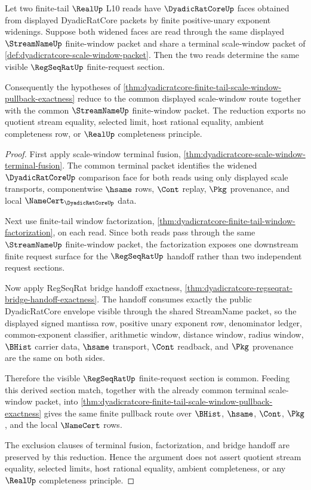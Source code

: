 \begin{theorem}
\label{thm:dyadicratcore-finite-tail-common-scale-window-reduction}
Let two finite-tail $\RealUp$ L10 reads have $\DyadicRatCoreUp$ faces obtained from displayed DyadicRatCore packets by finite positive-unary exponent widenings. Suppose both widened faces are read through the same displayed $\StreamNameUp$ finite-window packet and share a terminal scale-window packet of \autoref{def:dyadicratcore-scale-window-packet}. Then the two reads determine the same visible $\RegSeqRatUp$ finite-request section.

Consequently the hypotheses of \autoref{thm:dyadicratcore-finite-tail-scale-window-pullback-exactness} reduce to the common displayed scale-window route together with the common $\StreamNameUp$ finite-window packet. The reduction exports no quotient stream equality, selected limit, host rational equality, ambient completeness row, or $\RealUp$ completeness principle.
\end{theorem}
\begin{proof}
First apply scale-window terminal fusion, \autoref{thm:dyadicratcore-scale-window-terminal-fusion}. The common terminal packet identifies the widened $\DyadicRatCoreUp$ comparison face for both reads using only displayed scale transports, componentwise $\hsame$ rows, $\Cont$ replay, $\Pkg$ provenance, and local $\NameCert_{\DyadicRatCoreUp}$ data.

Next use finite-tail window factorization, \autoref{thm:dyadicratcore-finite-tail-window-factorization}, on each read. Since both reads pass through the same $\StreamNameUp$ finite-window packet, the factorization exposes one downstream finite request surface for the $\RegSeqRatUp$ handoff rather than two independent request sections.

Now apply RegSeqRat bridge handoff exactness, \autoref{thm:dyadicratcore-regseqrat-bridge-handoff-exactness}. The handoff consumes exactly the public DyadicRatCore envelope visible through the shared StreamName packet, so the displayed signed mantissa row, positive unary exponent row, denominator ledger, common-exponent classifier, arithmetic window, distance window, radius window, $\BHist$ carrier data, $\hsame$ transport, $\Cont$ readback, and $\Pkg$ provenance are the same on both sides.

Therefore the visible $\RegSeqRatUp$ finite-request section is common. Feeding this derived section match, together with the already common terminal scale-window packet, into \autoref{thm:dyadicratcore-finite-tail-scale-window-pullback-exactness} gives the same finite pullback route over $\BHist$, $\hsame$, $\Cont$, $\Pkg$, and the local $\NameCert$ rows.

The exclusion clauses of terminal fusion, factorization, and bridge handoff are preserved by this reduction. Hence the argument does not assert quotient stream equality, selected limits, host rational equality, ambient completeness, or any $\RealUp$ completeness principle.
\end{proof}

